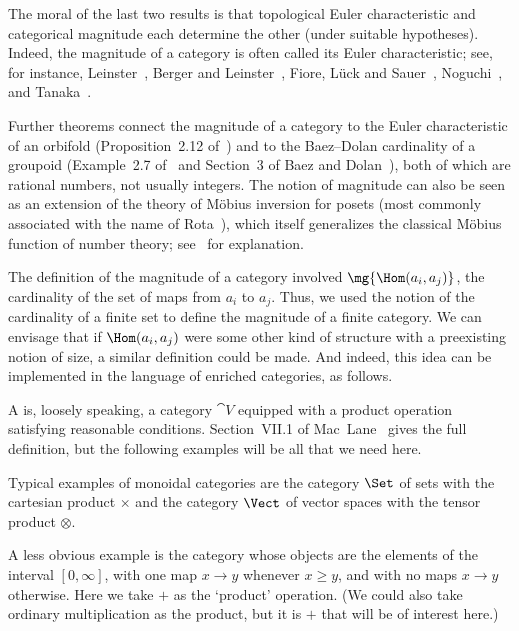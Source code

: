The moral of the last two results is that topological Euler characteristic
and categorical magnitude each determine the other (under suitable
hypotheses).  Indeed, the magnitude of a category is often called its Euler
characteristic; see, for instance, Leinster~\cite{ECC}, Berger and
Leinster~\cite{ECCSDS}, Fiore, L\"uck and Sauer~\cite{FLSECC,FLSFOE},
Noguchi~\cite{NoguECA,NoguECC,NoguZFF}, and Tanaka~\cite{TanaECB}.

Further theorems connect the magnitude of a category to the Euler
characteristic of an orbifold (Proposition~2.12 of~\cite{ECC}) and to the
Baez--Dolan%
% 
%
%
%
% 
cardinality of a groupoid (Example~2.7 of~\cite{ECC} and
Section~3 of Baez and Dolan~\cite{BaDoFSF}), both of which are rational
numbers, not usually integers.  The notion of magnitude can also be seen as
an extension of the theory of M\"obius%
% 
% 
inversion for posets (most commonly
associated with the name of Rota~\cite{RotaFCT}),%
%
% 
which itself generalizes the classical M\"obius function of number theory;
see~\cite{ECC,NMI} for explanation.

The definition of the magnitude of a category involved $\mg{\Hom(a_i,
  a_j)}$, the cardinality of the set of maps from $a_i$ to $a_j$.  Thus, we
used the notion of the cardinality of a finite set to define the magnitude
of a finite category.  We can envisage that if $\Hom(a_i, a_j)$ were some
other kind of structure with a preexisting notion of size, a similar
definition could be made.  And indeed, this idea can be implemented in the
language of enriched categories, as follows.

A  is, loosely speaking, a category $\cat{V}$ equipped with a
product operation satisfying reasonable conditions.  Section~VII.1 of
Mac~Lane~\cite{MacLCWM} gives the full definition, but the following
examples will be all that we need here.

\begin{examples}
Typical examples of monoidal categories are the category $\Set$ of sets
with the cartesian product $\times$ and the category $\Vect$ of vector
spaces with the tensor product $\otimes$.

A less obvious example is the category whose objects are the elements of
the interval $[0, \infty]$, with one map $x \to y$ whenever $x \geq y$, and
with no maps $x \to y$ otherwise.  Here we take $+$ as the `product'
operation.  (We could also take ordinary multiplication as the product, but
it is $+$ that will be of interest here.)
\end{examples}

